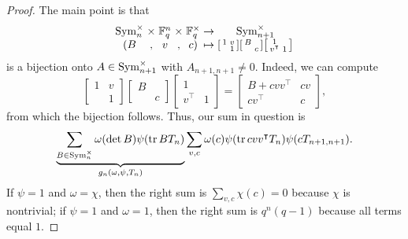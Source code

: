 \begin{proof}
    The main point is that
    \[\arraycolsep=1.4pt\begin{array}{ccccccc}
        \operatorname{Sym}_n^\times & \times & \FF_q^n & \times & \FF_q^\times & \to & \Sym_{n+1}^\times \\
        (B & , & v & , & c) & \mapsto & \displaystyle\begin{bsmallmatrix}
            1 & v \\
              & 1
        \end{bsmallmatrix}\begin{bsmallmatrix}
            B \\ & c
        \end{bsmallmatrix}\begin{bsmallmatrix}
            1 \\ v^\intercal & 1
        \end{bsmallmatrix}
    \end{array}\]
    is a bijection onto $A\in\operatorname{Sym}_{n+1}^\times$ with $A_{n+1,n+1}\ne0$. Indeed, we can compute
    \[\begin{bmatrix}
        1 & v \\
          & 1
    \end{bmatrix}\begin{bmatrix}
        B \\ & c
    \end{bmatrix}\begin{bmatrix}
        1 \\ v^\intercal & 1
    \end{bmatrix}=\begin{bmatrix}
        B+cvv^\intercal & cv \\
        cv^\intercal & c
    \end{bmatrix},\]
    from which the bijection follows. Thus, our sum in question is
    \[\underbrace{\sum_{B\in\operatorname{Sym}_n^\times}\omega(\det B)\psi(\operatorname{tr} BT_n)}_{g_n(\omega,\psi,T_n)}\sum_{v,c}\omega(c)\psi(\operatorname{tr} cvv^\intercal T_n)\psi(cT_{n+1,n+1}).\]
    If $\psi=1$ and $\omega=\chi$, then the right sum is $\sum_{v,c}\chi(c)=0$ because $\chi$ is nontrivial; if $\psi=1$ and $\omega=1$, then the right sum is $q^n(q-1)$ because all terms equal $1$.


\end{proof}

